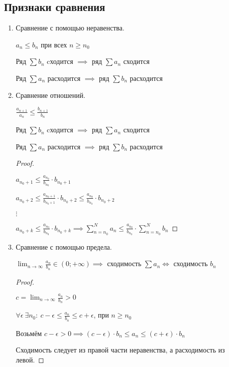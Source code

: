 \subsection{Признаки сравнения}
	\begin{enumerate}
	\item Сравнение с помощью неравенства.
	
	$a_n \leqslant b_n$ при всех $n \geqslant n_0$
	
	Ряд $\sum b_n$ cходится $\implies$ ряд $\sum a_n$ сходится
	
	Ряд $\sum a_n$ расходится $\implies$ ряд $\sum b_n$ расходится
	
	
	\item Сравнение отношений.
	
	$\frac{a_{n+1}}{a_n} \leqslant \frac{b_{n+1}}{b_n}$
	
	Ряд $\sum b_n$ cходится $\implies$ ряд $\sum a_n$ сходится
	
	Ряд $\sum a_n$ расходится $\implies$ ряд $\sum b_n$ расходится
	
	\begin{proof}~
	
	$a_{n_0+1} \leqslant \frac{a_{n_0}}{b_{n_0}}\cdot b_{n_0 + 1}$
	
	$a_{n_0+2} \leqslant \frac{a_{n_0 + 1}}{b_{n_0 + 1}}\cdot b_{n_0 + 2} \leqslant \frac{a_{n_0}}{b_{n_0}}\cdot b_{n_0 + 2}$
	
	$\vdots$
	
	$a_{n_0+k} \leqslant \frac{a_{n_0}}{b_{n_0}}\cdot b_{n_0 + k} \implies \sum_{n=n_0}^{N} a_n \leqslant \frac{a_{n_0}}{b_{n_0}}\cdot \sum_{n=n_0}^{N} b_n$
	\end{proof}

	\item Сравнение с помощью предела.
	
	$\lim_{n \to \infty} \frac{a_n}{b_n} \in (0; +\infty) \implies$ сходимость $\sum a_n \iff$ сходимость $b_n$
	
	\begin{proof}~
		
	$c = \lim_{n \to \infty} \frac{a_n}{b_n} > 0$
	
	$\forall \epsilon\ \exists n_0:\ c - \epsilon \leqslant \frac{a_n}{b_n} \leqslant c + \epsilon$, при $n \geqslant n_0$
	
	Возьмём $c - \epsilon > 0 \implies (c - \epsilon)\cdot b_n \leqslant a_n \leqslant (c + \epsilon)\cdot b_n$
	
	Сходимость следует из правой части неравенства, а расходимость из левой. 
	\end{proof}
\end{enumerate}
